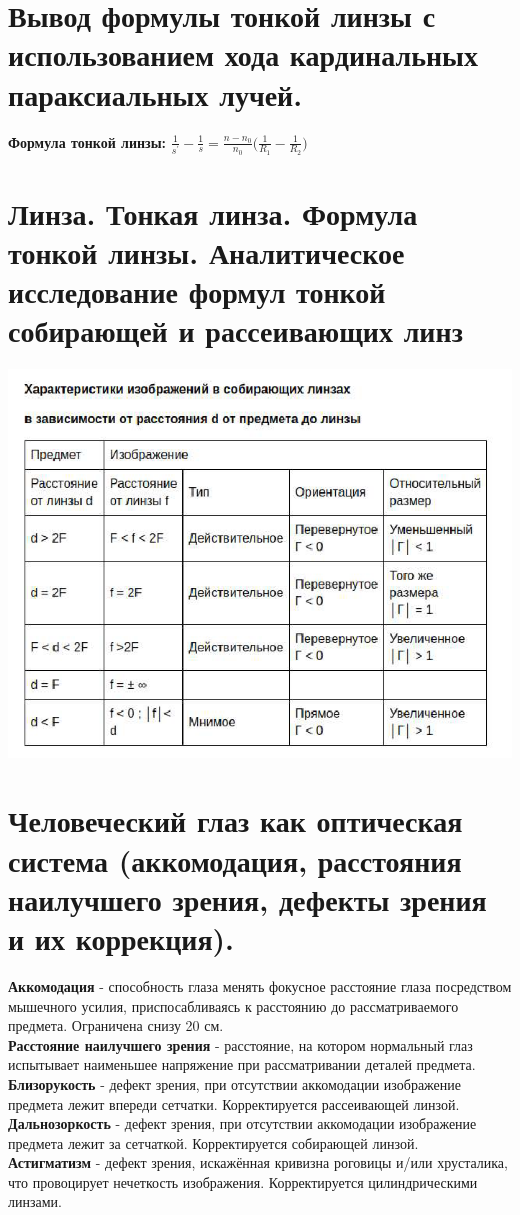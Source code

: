 \documentclass[14pt]{extarticle}
\begin{document}
\section{Вывод формулы тонкой линзы с использованием хода кардинальных параксиальных
лучей.}
\textbf{Формула тонкой линзы:} $\frac{1}{s^{'}} - 
\frac{1}{s} = \frac{n - n_0}{n_0} \bigl(\frac{1}{R_1}
-\frac{1}{R_2}\bigr)$
\section{Линза. Тонкая линза. Формула тонкой линзы. Аналитическое исследование формул
тонкой собирающей и рассеивающих линз}
\includegraphics{lense_analysis.png}
\section{ Человеческий глаз как оптическая система (аккомодация, 
расстояния наилучшего зрения, дефекты зрения и их коррекция).}
\textbf{Аккомодация} - способность глаза менять фокусное расстояние
глаза посредством мышечного усилия, приспосабливаясь к 
расстоянию до рассматриваемого предмета. Ограничена снизу 20 см.\\
\textbf{Расстояние наилучшего зрения} - расстояние, на котором
нормальный глаз испытывает наименьшее напряжение при 
рассматривании деталей предмета.\\
\textbf{Близорукость} - дефект зрения, при отсутствии 
аккомодации изображение предмета лежит впереди сетчатки. 
Корректируется рассеивающей линзой.\\
\textbf{Дальнозоркость} - дефект зрения, при отсутствии 
аккомодации изображение предмета лежит за сетчаткой. 
Корректируется собирающей линзой.\\
\textbf{Астигматизм} - дефект зрения, искажённая кривизна 
роговицы и/или хрусталика, что провоцирует нечеткость изображения. 
Корректируется цилиндрическими линзами.\\
\end{document}
